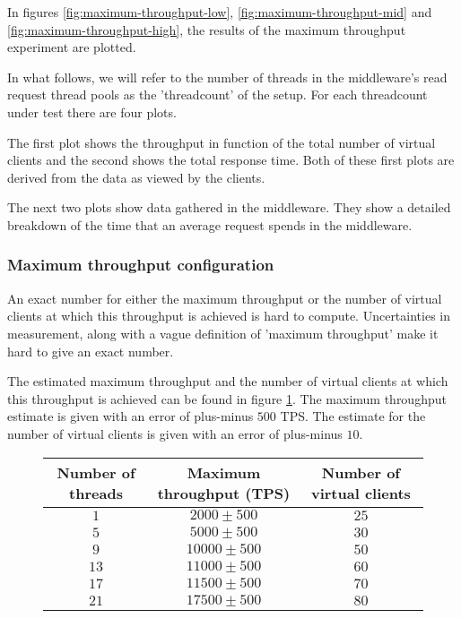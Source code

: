\documentclass[11pt]{article}
\begin{document}
In figures \ref{fig:maximum-throughput-low}, \ref{fig:maximum-throughput-mid} and \ref{fig:maximum-throughput-high}, the results of the maximum throughput experiment are plotted.

In what follows, we will refer to the number of threads in the middleware's read request thread pools as the 'threadcount' of the setup.
For each threadcount under test there are four plots.

The first plot shows the throughput in function of the total number of virtual clients and the second shows the total response time.
Both of these first plots are derived from the data as viewed by the clients.

The next two plots show data gathered in the middleware.
They show a detailed breakdown of the time that an average request spends in the middleware.

\subsubsection{Maximum throughput configuration}


An exact number for either the maximum throughput or the number of virtual clients at which this throughput is achieved is hard to compute.
Uncertainties in measurement, along with a vague definition of 'maximum throughput' make it hard to give an exact number.

The estimated maximum throughput and the number of virtual clients at which this throughput is achieved can be found in figure \ref{fig:maximum-throughput-numbers}.
The maximum throughput estimate is given with an error of plus-minus $500$ TPS.
The estimate for the number of virtual clients is given with an error of plus-minus $10$.

\begin{figure}[H]
  \centering
  \begin{tabular}{c|c|c}
    Number of threads & Maximum throughput (TPS) & Number of virtual clients \\
    \hline $1$ & $2000 \pm 500$ & $25$ \\
    \hline $5$ & $5000 \pm 500$ & $30$ \\
    \hline $9$ & $10000 \pm 500$ & $50$ \\
    \hline $13$ & $11000 \pm 500$ & $60$ \\
    \hline $17$ & $11500 \pm 500$ & $70$ \\
    \hline $21$ & $17500 \pm 500$ & $80$ \\
  \end{tabular}
  \label{fig:maximum-throughput-numbers}
\end{figure}
\end{document}
